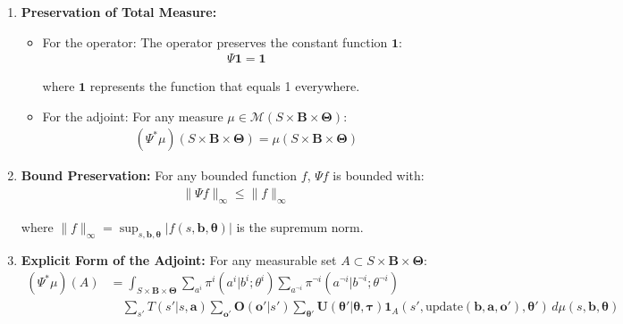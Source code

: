 \begin{lemma}
\begin{enumerate}
        \item \textbf{Preservation of Total Measure:}
              \begin{itemize}
                  \item For the operator: The operator preserves the constant function
                        $\mathbf{1}$:
                        \begin{align}
                            \Psi \mathbf{1}= \mathbf{1}
                        \end{align}

                        where $\mathbf{1}$ represents the function that equals 1 everywhere.

                  \item For the adjoint: For any measure
                        $\mu \in \mathcal{M}(S \times \boldsymbol{B}\times \boldsymbol{\Theta})$:
                        \begin{align}
                            (\Psi^{*}\mu)(S \times \boldsymbol{B}\times \boldsymbol{\Theta}) = \mu(S \times \boldsymbol{B}\times \boldsymbol{\Theta})
                        \end{align}
              \end{itemize}

        \item \textbf{Bound Preservation:} For any bounded function $f$, $\Psi f$ is
              bounded with:
              \begin{align}
                  \|\Psi f\|_{\infty}\leq \|f\|_{\infty}
              \end{align}

              where $\|f\|_{\infty}= \sup_{s,\boldsymbol{b},\boldsymbol{\theta}}|f(s,\boldsymbol
                  {b},\boldsymbol{\theta})|$ is the supremum norm.

        \item \textbf{Explicit Form of the Adjoint:} For any measurable set
              $A \subset S \times \boldsymbol{B}\times \boldsymbol{\Theta}$:
              \begin{align}
                  (\Psi^{*}\mu)(A) & = \int_{S \times \boldsymbol{B} \times \boldsymbol{\Theta}}\sum_{a^i}\pi^{i}(a^{i}|b^{i}; \theta^{i}) \sum_{a^{\neg i}}\pi^{\neg i}(a^{\neg i}|b^{\neg i}; \theta^{\neg i})                                                                                                                                                                                     \\
                                   & \quad \sum_{s'}T(s'|s, \boldsymbol{a}) \sum_{\boldsymbol{o}'}\boldsymbol{O}(\boldsymbol{o}'|s') \sum_{\boldsymbol{\theta}'}\boldsymbol{U}(\boldsymbol{\theta}'|\boldsymbol{\theta}, \boldsymbol{\tau}) \mathbf{1}_{A}(s', \text{update}(\boldsymbol{b}, \boldsymbol{a}, \boldsymbol{o}'), \boldsymbol{\theta}') \, d\mu(s, \boldsymbol{b}, \boldsymbol{\theta})
              \end{align}


\end{enumerate}
\end{lemma}
